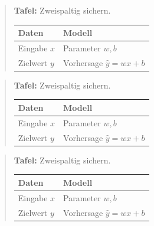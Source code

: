 \begin{frame}[t]
\begin{quote}
\textbf{Tafel:} Zweispaltig sichern.

\par\addvspace{\medskipamount}
\noindent\begin{tabularx}{\linewidth}{@{}>{\raggedright\arraybackslash}p{}>{\raggedright\arraybackslash}X@{}}
\toprule
Daten & Modell \\
\midrule
Eingabe $x$ & Parameter $w,b$ \\
Zielwert $y$ & Vorhersage $\hat y=wx+b$ \\
\bottomrule
\end{tabularx}
\par\addvspace{\medskipamount}
\end{quote}
\end{frame}

\begin{frame}[t]
\begin{quote}
\textbf{Tafel:} Zweispaltig sichern.

\par\addvspace{\medskipamount}
\noindent\begin{tabularx}{\linewidth}{@{}>{\raggedright\arraybackslash}p{}>{\raggedright\arraybackslash}X@{}}
\toprule
Daten & Modell \\
\midrule
Eingabe $x$ & Parameter $w,b$ \\
Zielwert $y$ & Vorhersage $\hat y=wx+b$ \\
\bottomrule
\end{tabularx}
\par\addvspace{\medskipamount}
\end{quote}
\end{frame}

\begin{frame}[t]
\begin{quote}
\textbf{Tafel:} Zweispaltig sichern.

\par\addvspace{\medskipamount}
\noindent\begin{tabularx}{\linewidth}{@{}>{\raggedright\arraybackslash}p{}>{\raggedright\arraybackslash}X@{}}
\toprule
Daten & Modell \\
\midrule
Eingabe $x$ & Parameter $w,b$ \\
Zielwert $y$ & Vorhersage $\hat y=wx+b$ \\
\bottomrule
\end{tabularx}
\par\addvspace{\medskipamount}
\end{quote}
\end{frame}

